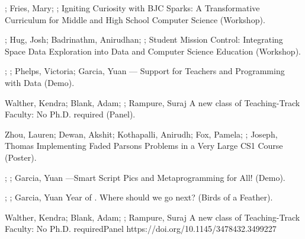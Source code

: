 \begin{etaremune}
    \setlength\itemsep{1em}
    
    \item{\dan; Fries, Mary; \me; \lauren \newline Igniting Curiosity with BJC Sparks: A Transformative Curriculum for Middle and High School Computer Science (Workshop). }
    
    \item{\dan; Hug, Josh; Badrinathm, Anirudhan;  \me; \lauren \newline Student Mission Control: Integrating Space Data Exploration into Data and Computer Science Education (Workshop). }

    \item{\me; \dan; Phelps, Victoria; Garcia, Yuan \newline {} — Support for Teachers and Programming with Data (Demo). }
    
    \item{Walther, Kendra; Blank, Adam; \me; Rampure, Suraj
    \newline A new class of Teaching-Track Faculty: No Ph.D. required (Panel).  }
    
    \item{Zhou, Lauren; Dewan, Akshit; Kothapalli, Anirudh; Fox, Pamela; \me; Joseph, Thomas
    \newline
    Implementing Faded Parsons Problems in a Very Large CS1 Course (Poster). }
    
    \item{\dan; \me; Garcia, Yuan \newline {}—Smart Script Pics and Metaprogramming for All! (Demo). }
    
    \item{\me; \dan; Garcia, Yuan  Year of \snap. Where should we go next? (Birds of a Feather). }
    
    \sigcsePVD
        {Walther, Kendra; Blank, Adam; \me; Rampure, Suraj}
        {A new class of Teaching-Track Faculty: No Ph.D. required}{Panel}
        {https://doi.org/10.1145/3478432.3499227}
    

\end{etaremune}
